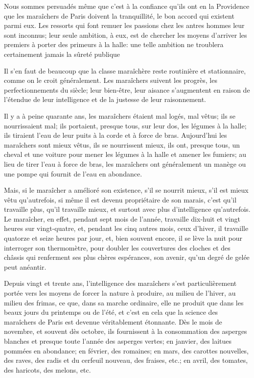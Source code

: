 \documentclass[10pt,a4paper]{book}
\begin{document}
Nous sommes persuadés même que c'est à la confiance qu'ils ont en la Providence que les maraîchers de Paris doivent la tranquillité, le bon accord qui existent parmi eux. Les ressorts qui font remuer les passions chez les antres hommes leur sont inconnus; leur seule ambition, à eux, est de chercher les moyens d'arriver les premiers à porter des primeurs à la halle: une telle ambition ne troublera certainement jamais la sûreté publique

Il s'en faut de beaucoup que la classe maraîchère reste routinière et stationnaire, comme on le croit généralement. Les maraîchers suivent les progrès, les perfectionnements du siècle; leur bien-être, leur aisance s'augmentent en raison de l'étendue de leur intelligence et de la justesse de leur raisonnement.

Il y a à peine quarante ans, les maraîchers étaient mal logés, mal vêtus; ils se nourrissaient mal; ils portaient, presque tous, sur leur dos, les légumes à la halle; ils tiraient l'eau de leur puits à la corde et à force de bras. Aujourd'hui les maraîchers sont mieux vêtus, ils se nourrissent mieux, ils ont, presque tous, un cheval et une voiture pour mener les légumes à la halle et amener les fumiers; au lieu de tirer l'eau à force de bras, les maraîchers ont généralement un manège ou une pompe qui fournit de l'eau en abondance.

Mais, si le maraîcher a amélioré son existence, s'il se nourrit mieux, s'il est mieux vêtu qu'autrefois, si même il est devenu propriétaire de son marais, c'est qu'il travaille plus, qu'il travaille mieux, et surtout avec plus d'intelligence qu'autrefois. Le maraîcher, en effet, pendant sept mois de l'année, travaille dix-huit et vingt heures sur vingt-quatre, et, pendant les cinq autres mois, ceux d'hiver, il travaille quatorze et seize heures par jour, et, bien souvent encore, il se lève la nuit pour interroger son thermomètre, pour doubler les couvertures des cloches et des châssis qui renferment ses plus chères espérances, son avenir, qu'un degré de gelée peut anéantir.

Depuis vingt et trente ans, l'intelligence des maraîchers s'est particulièrement portée vers les moyens de forcer la nature à produire, au milieu de l'hiver, au milieu des frimas, ce que, dans sa marche ordinaire, elle ne produit que dans les beaux jours du printemps ou de l'été, et c'est en cela que la science des maraîchers de Paris est devenue véritablement étonnante. Dès le mois de novembre, et souvent dès octobre, ils fournissent à la consommation des asperges blanches et presque toute l'année des asperges vertes; en janvier, des laitues pommées en abondance; en février, des romaines; en mars, des carottes nouvelles, des raves, des radis et du cerfeuil nouveau, des fraises, etc.; en avril, des tomates, des haricots, des melons, etc.
\end{document}
